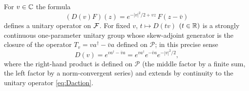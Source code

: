 \begin{theorem}\label{thm:displacement}
For $v\in\mathbb{C}$ the formula
\begin{equation}\label{eq:Daction}
 (D(v)F)(z)=e^{-|v|^2/2+vz}\,F(z-\bar v)
\end{equation}
defines a unitary operator on $\mathcal{F}$. For fixed $v$, $t\mapsto D(tv)$
$(t\in\mathbb{R})$ is a strongly continuous one-parameter unitary group whose
skew-adjoint generator is the closure of the operator
$T_v=va^\dagger-\bar va$ defined on $\mathcal P$; in this precise sense
\begin{equation}\label{eq:normalorder}
 D(v)=e^{va^\dagger-\bar va}=e^{va^\dagger}e^{-\bar va}e^{-|v|^2/2},
\end{equation}
where the right-hand product is defined on $\mathcal P$ (the middle factor
by a finite sum, the left factor by a norm-convergent series) and extends by
continuity to the unitary operator \eqref{eq:Daction}.
\end{theorem}
